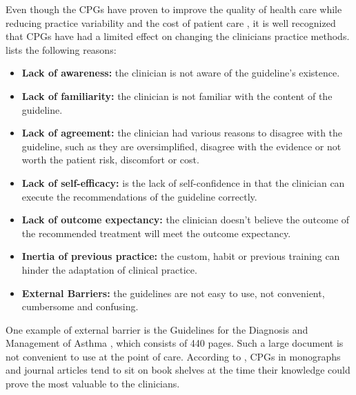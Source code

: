 Even though the CPGs have proven to improve the quality of health care while reducing practice variability and the cost of patient care \parencite{DeClercq2008}, it is well recognized that CPGs have had a limited effect on changing the clinicians practice methods. \textcite{Cabana1999} lists the following reasons:
\begin{itemize}
	\item \textbf{Lack of awareness:} the clinician is not aware of the guideline's existence.
	\item \textbf{Lack of familiarity:} the clinician is not familiar with the content of the guideline.
	\item \textbf{Lack of agreement:} the clinician had various reasons to disagree with the guideline, such as they are oversimplified, disagree with the evidence or not worth the patient risk, discomfort or cost.
	\item \textbf{Lack of self-efficacy:} is the lack of self-confidence in that the clinician can execute the recommendations of the guideline correctly.
	\item \textbf{Lack of outcome expectancy:} the clinician doesn't believe the outcome of the recommended treatment will meet the outcome expectancy.
	\item \textbf{Inertia of previous practice:} the custom, habit or previous training can hinder the adaptation of clinical practice.
	\item \textbf{External Barriers:} the guidelines are not easy to use, not convenient, cumbersome and confusing.
\end{itemize}One example of external barrier is the Guidelines for the Diagnosis and Management of Asthma \parencite{NationalHeartLungandBloodInstitute2007}, which consists of 440 pages. Such a large document is not convenient to use at the point of care. According to \textcite{Shortliffe1998}, CPGs in monographs and journal articles tend to sit on book shelves at the time their knowledge could prove the most valuable to the clinicians. 

